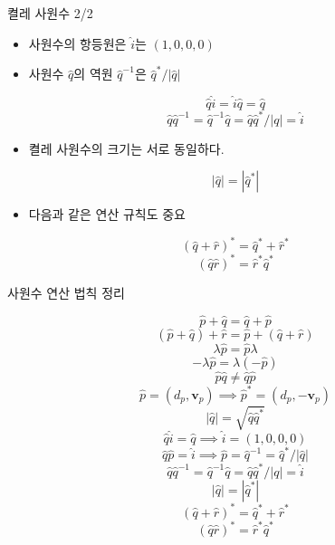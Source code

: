 \begin{frame}[fragile]{켤레 사원수 2/2}

\begin{itemize}
\item 사원수의 항등원은 $\hat i$는 $(1,0,0,0)$
\item 사원수 $\hat q$의 역원 $\hat q^{-1}$은 $\hat q^* / |\hat q|$
\end{itemize}

$$\hat q \hat i = \hat i \hat q = \hat q$$
$$\hat q \hat q^{-1} = \hat q^{-1} \hat q = \hat q \hat q^* / |q| = \hat i$$

\begin{itemize}
\item 켤레 사원수의 크기는 서로 동일하다.
\end{itemize}

$$|\hat q| = |\hat q^*|$$

\begin{itemize}
\item 다음과 같은 연산 규칙도 중요
\end{itemize}

$$(\hat q + \hat r)^* = \hat q^* + \hat r^*$$
$$(\hat q \hat r)^* = \hat r^* \hat q^*$$


\end{frame}

\begin{frame}[fragile]{사원수 연산 법칙 정리}

{\small
$$\hat{p} + \hat{q} = \hat{q} + \hat{p}$$
$$(\hat{p} + \hat{q}) + \hat{r} = \hat{p} + (\hat{q} + \hat{r} )$$
$$\lambda \hat p = \hat p \lambda$$
$$- \lambda \hat p = \lambda ( - \hat p)$$
$$\hat p \hat q \neq \hat q \hat p$$
$$\hat p = (d_p ,  \mathbf v_p) \implies \hat p^* = (d_p , -\mathbf v_p)$$
$$|\hat q|  =  \sqrt{\hat q \hat q^*} $$
$$ \hat q \hat i = \hat q \implies \hat i = (1,0,0,0)$$
$$ \hat q \hat p = \hat i \implies \hat p = \hat q^{-1} = \hat q^* / |\hat q|$$
$$\hat q \hat q^{-1} = \hat q^{-1} \hat q = \hat q \hat q^* / |q| = \hat i$$
$$|\hat q| = |\hat q^*|$$
$$(\hat q + \hat r)^* = \hat q^* + \hat r^*$$
$$(\hat q \hat r)^* = \hat r^* \hat q^*$$
}

\end{frame}

